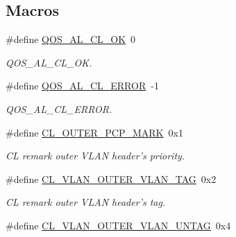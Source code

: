 \subsection*{Macros}
\begin{DoxyCompactItemize}
\item 
\hypertarget{group__FAPI__QOS__CLASS_ga944555fb1618026c789f367d44f30af6}{\#define \hyperlink{group__FAPI__QOS__CLASS_ga944555fb1618026c789f367d44f30af6}{Q\-O\-S\-\_\-\-A\-L\-\_\-\-C\-L\-\_\-\-O\-K}~0}\label{group__FAPI__QOS__CLASS_ga944555fb1618026c789f367d44f30af6}

\begin{DoxyCompactList}\small\item\em Q\-O\-S\-\_\-\-A\-L\-\_\-\-C\-L\-\_\-\-O\-K. \end{DoxyCompactList}\item 
\hypertarget{group__FAPI__QOS__CLASS_gad320b1c6f6000c71b43a53d3f249a3c6}{\#define \hyperlink{group__FAPI__QOS__CLASS_gad320b1c6f6000c71b43a53d3f249a3c6}{Q\-O\-S\-\_\-\-A\-L\-\_\-\-C\-L\-\_\-\-E\-R\-R\-O\-R}~-\/1}\label{group__FAPI__QOS__CLASS_gad320b1c6f6000c71b43a53d3f249a3c6}

\begin{DoxyCompactList}\small\item\em Q\-O\-S\-\_\-\-A\-L\-\_\-\-C\-L\-\_\-\-E\-R\-R\-O\-R. \end{DoxyCompactList}\item 
\hypertarget{group__FAPI__QOS__CLASS_ga39f8c99d59e0239bca697d3fb01f7d7e}{\#define \hyperlink{group__FAPI__QOS__CLASS_ga39f8c99d59e0239bca697d3fb01f7d7e}{C\-L\-\_\-\-O\-U\-T\-E\-R\-\_\-\-P\-C\-P\-\_\-\-M\-A\-R\-K}~0x1}\label{group__FAPI__QOS__CLASS_ga39f8c99d59e0239bca697d3fb01f7d7e}

\begin{DoxyCompactList}\small\item\em C\-L remark outer V\-L\-A\-N header's priority. \end{DoxyCompactList}\item 
\hypertarget{group__FAPI__QOS__CLASS_gaf3b63d816a81b4ecbe00738f6403eac1}{\#define \hyperlink{group__FAPI__QOS__CLASS_gaf3b63d816a81b4ecbe00738f6403eac1}{C\-L\-\_\-\-V\-L\-A\-N\-\_\-\-O\-U\-T\-E\-R\-\_\-\-V\-L\-A\-N\-\_\-\-T\-A\-G}~0x2}\label{group__FAPI__QOS__CLASS_gaf3b63d816a81b4ecbe00738f6403eac1}

\begin{DoxyCompactList}\small\item\em C\-L remark outer V\-L\-A\-N header's tag. \end{DoxyCompactList}\item 
\hypertarget{group__FAPI__QOS__CLASS_gad420a0fbcdfb3fcecbaac5f6dc92b53f}{\#define \hyperlink{group__FAPI__QOS__CLASS_gad420a0fbcdfb3fcecbaac5f6dc92b53f}{C\-L\-\_\-\-V\-L\-A\-N\-\_\-\-O\-U\-T\-E\-R\-\_\-\-V\-L\-A\-N\-\_\-\-U\-N\-T\-A\-G}~0x4}\label{group__FAPI__QOS__CLASS_gad420a0fbcdfb3fcecbaac5f6dc92b53f}


\end{DoxyCompactItemize}
